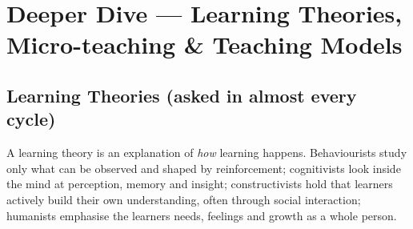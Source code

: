 \needspace{161pt}

\hypertarget{p1-01--7-deeper-dive--learning-theories-micro-teaching--teaching-models}{%
\section{Deeper Dive --- Learning Theories, Micro-teaching \& Teaching Models}\label{p1-01--7-deeper-dive--learning-theories-micro-teaching--teaching-models}}

\needspace{125pt}

\hypertarget{p1-01--71-learning-theories-asked-in-almost-every-cycle}{%
\subsection{Learning Theories (asked in almost every cycle)}\label{p1-01--71-learning-theories-asked-in-almost-every-cycle}}

A learning theory is an explanation of \emph{how} learning happens. Behaviourists study only what can be
observed and shaped by reinforcement; cognitivists look inside the mind at perception, memory and insight;
constructivists hold that learners actively build their own understanding, often through social
interaction; humanists emphasise the learner\textquotesingle s needs, feelings and growth as a whole person.



\begingroup\small

